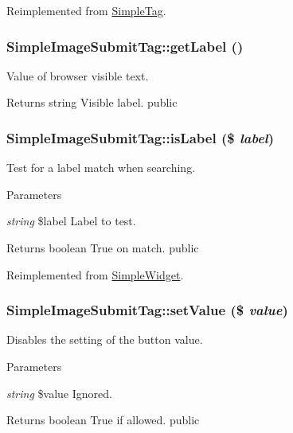 Reimplemented from \hyperlink{class_simple_tag_a158fcbf8b82e7a6f7b6855c1dbe0715b}{SimpleTag}.\hypertarget{class_simple_image_submit_tag_a40627673e9710873f88088cc4c327afe}{
\subsubsection[{getLabel}]{\setlength{\rightskip}{0pt plus 5cm}SimpleImageSubmitTag::getLabel ()}}
\label{class_simple_image_submit_tag_a40627673e9710873f88088cc4c327afe}
Value of browser visible text. \begin{DoxyReturn}{Returns}
string Visible label.  public 
\end{DoxyReturn}
\hypertarget{class_simple_image_submit_tag_ab38d48f8710f8df763ff0753f8035146}{
\subsubsection[{isLabel}]{\setlength{\rightskip}{0pt plus 5cm}SimpleImageSubmitTag::isLabel (\$ {\em label})}}
\label{class_simple_image_submit_tag_ab38d48f8710f8df763ff0753f8035146}
Test for a label match when searching. 
\begin{DoxyParams}{Parameters}
\item[{\em string}]\$label Label to test. \end{DoxyParams}
\begin{DoxyReturn}{Returns}
boolean True on match.  public 
\end{DoxyReturn}


Reimplemented from \hyperlink{class_simple_widget_ab4560f7a1b68df77c3ee34f6bc81dcab}{SimpleWidget}.\hypertarget{class_simple_image_submit_tag_ae66a60f527c8cde0d2fd883c3d894da3}{
\subsubsection[{setValue}]{\setlength{\rightskip}{0pt plus 5cm}SimpleImageSubmitTag::setValue (\$ {\em value})}}
\label{class_simple_image_submit_tag_ae66a60f527c8cde0d2fd883c3d894da3}
Disables the setting of the button value. 
\begin{DoxyParams}{Parameters}
\item[{\em string}]\$value Ignored. \end{DoxyParams}
\begin{DoxyReturn}{Returns}
boolean True if allowed.  public 
\end{DoxyReturn}


